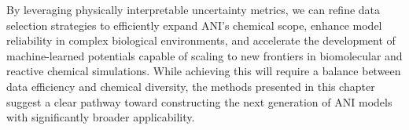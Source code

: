By leveraging physically interpretable uncertainty metrics, we can refine data selection strategies to efficiently expand ANI's chemical scope, enhance model reliability in complex biological environments, and accelerate the development of machine-learned potentials capable of scaling to new frontiers in biomolecular and reactive chemical simulations. While achieving this will require a balance between data efficiency and chemical diversity, the methods presented in this chapter suggest a clear pathway toward constructing the next generation of ANI models with significantly broader applicability.